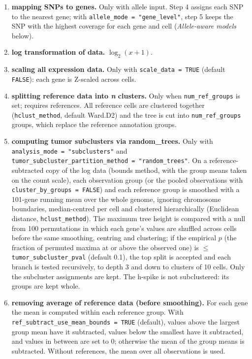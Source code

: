 \begin{enumerate}
\item[\textbf{4--5}] \textbf{mapping SNPs to genes.} Only with allele input. Step 4 assigns each SNP to the nearest gene; with \texttt{allele\_mode\ =\ "gene\_level"}, step 5 keeps the SNP with the highest coverage for each gene and cell (\emph{Allele-aware models} below).

\item[\textbf{6}] \textbf{log transformation of data.} $\log_2(x+1)$.

\item[\textbf{7}] \textbf{scaling all expression data.} Only with \texttt{scale\_data\ =\ TRUE} (default \texttt{FALSE}): each gene is Z-scaled across cells.

\item[\textbf{8}] \textbf{splitting reference data into \textit{n} clusters.} Only when \texttt{num\_ref\_groups} is set; requires references. All reference cells are clustered together (\texttt{hclust\_method}, default Ward.D2) and the tree is cut into \texttt{num\_ref\_groups} groups, which replace the reference annotation groups.

\item[\textbf{9}] \textbf{computing tumor subclusters via random\_trees.} Only with \texttt{analysis\_mode\ =\ "subclusters"} and \texttt{tumor\_subcluster\_partition\_method\ =\ "random\_trees"}. On a reference-subtracted copy of the log data (bounds method, with the group means taken on the count scale), each observation group (or the pooled observations with \texttt{cluster\_by\_groups\ =\ FALSE}) and each reference group is smoothed with a 101-gene running mean over the whole genome, ignoring chromosome boundaries, median-centred per cell and clustered hierarchically (Euclidean distance, \texttt{hclust\_method}). The maximum tree height is compared with a null from 100 permutations in which each gene's values are shuffled across cells before the same smoothing, centring and clustering; if the empirical $p$ (the fraction of permuted maxima at or above the observed one) is $\leq$ \texttt{tumor\_subcluster\_pval} (default 0.1), the top split is accepted and each branch is tested recursively, to depth 3 and down to clusters of 10 cells. Only the subcluster assignments are kept. The h-spike is not subclustered: its groups are kept whole.

\item[\textbf{10}] \textbf{removing average of reference data (before smoothing).} For each gene the mean is computed within each reference group. With \texttt{ref\_subtract\_use\_mean\_bounds\ =\ TRUE} (default), values above the largest group mean have it subtracted, values below the smallest have it subtracted, and values in between are set to 0; otherwise the mean of the group means is subtracted. Without references, the mean over all observations is used.


\end{enumerate}
